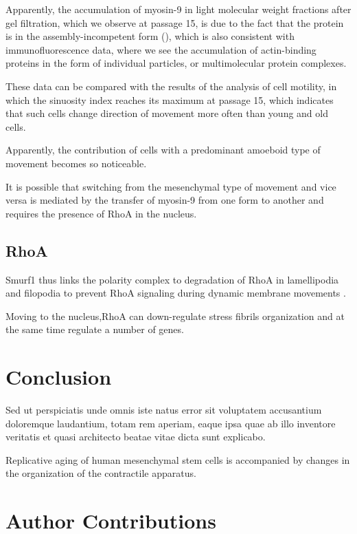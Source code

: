 \documentclass[english,authoryear]{elsarticle}
\begin{document}
Apparently, the accumulation of myosin-9 in light molecular weight fractions after gel filtration, which we observe at passage 15, is due to the fact that the protein is in the assembly-incompetent form (\cite{vicente2009non}), which is also consistent with immunofluorescence data, where we see the accumulation of actin-binding proteins in the form of individual particles, or multimolecular protein complexes.

\cite{shutova2018mammalian}

These data can be compared with the results of the analysis of cell motility, in which the sinuosity index reaches its maximum at passage 15, which indicates that such cells change direction of movement more often than young and old cells.

Apparently, the contribution of cells with a predominant amoeboid type of movement becomes so noticeable.

It is possible that switching from the mesenchymal type of movement and vice versa is mediated by the transfer of myosin-9 from one form to another and requires the presence of RhoA in the nucleus.


\subsection*{RhoA}

 Smurf1 thus links the polarity complex to degradation of RhoA in lamellipodia and filopodia to prevent RhoA signaling during dynamic membrane movements \cite{wang2003regulation}.

 Moving to the nucleus,RhoA can down-regulate stress fibrils organization and at the same time regulate a number of genes.


\section*{Conclusion}

Sed ut perspiciatis unde omnis iste natus error sit voluptatem accusantium doloremque laudantium, totam rem aperiam, eaque ipsa quae ab illo inventore veritatis et quasi architecto beatae vitae dicta sunt explicabo.

Replicative aging of human mesenchymal stem cells is accompanied by changes in the organization of the contractile apparatus.

\section*{Author Contributions}
\end{document}
